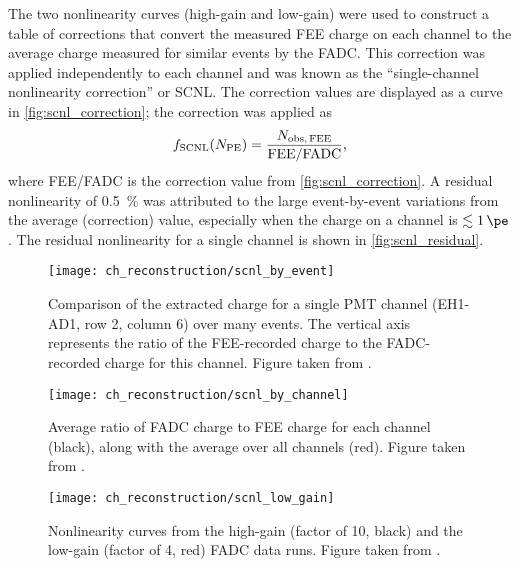 The two nonlinearity curves (high-gain and low-gain) were used
to construct a table of corrections
that convert the measured FEE charge on each channel
to the average charge measured for similar events by the FADC.
This correction was applied independently to each channel
and was known as the ``single-channel nonlinearity correction'' or SCNL.
The correction values are displayed as a curve in \cref{fig:scnl_correction};
the correction was applied as
\begin{equation}\label{eq:scnl}
    f_\text{SCNL}(N_\text{PE}) = \frac{N_\text{obs,\,FEE}}{\text{FEE/FADC}},
\end{equation}
where FEE/FADC is the correction value from \cref{fig:scnl_correction}.
A residual nonlinearity of \SI{0.5}{\percent}
was attributed to the large event-by-event variations
from the average (correction) value,
especially when the charge on a channel is $\lesssim\SI{1}{\pe}$.
The residual nonlinearity for a single channel is shown in \cref{fig:scnl_residual}.

\begin{figure}
    \centering
    \texttt{[image: ch\_reconstruction/scnl\_by\_event]}
    \caption[Flash ADC comparison to FEE, event by event]{
        Comparison of the extracted charge for a single PMT channel
        (EH1-AD1, row 2, column 6)
        over many events.
        The vertical axis represents the ratio of the FEE-recorded charge
        to the FADC-recorded charge for this channel.
        Figure taken from \cite{scnl_technote}.
    }
    \label{fig:scnl_by_event}
\end{figure}

\begin{figure}
    \centering
    \texttt{[image: ch\_reconstruction/scnl\_by\_channel]}
    \caption[Flash ADC comparison to FEE, channel by channel]{
        Average ratio of FADC charge to FEE charge for each channel (black),
        along with the average over all channels (red).
        Figure taken from \cite{scnl_technote}.
    }
    \label{fig:scnl_by_channel}
\end{figure}

\begin{figure}
    \centering
    \texttt{[image: ch\_reconstruction/scnl\_low\_gain]}
    \caption[Flash ADC comparison to FEE, low gain]{
        Nonlinearity curves from the high-gain (factor of 10, black)
        and the low-gain (factor of 4, red)
        FADC data runs.
        Figure taken from \cite{scnl_slides}.
    }
    \label{fig:scnl_low_gain}
\end{figure}

